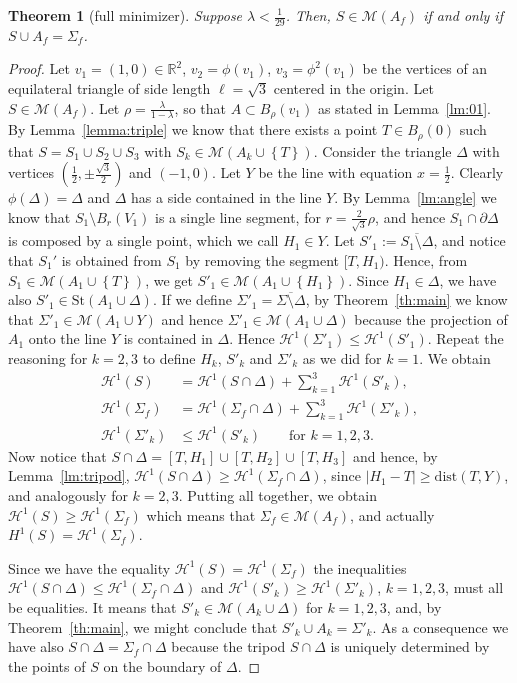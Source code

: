 \documentclass{amsart}
\newcommand{\RR}{\mathbb R}
\renewcommand{\H}{\mathcal H}
\newcommand{\abs}[1]{\left\vert #1 \right\vert}
\newcommand{\enclose}[1]{\left(#1\right)}
\newcommand{\ENCLOSE}[1]{\left\{#1\right\}}
\newcommand{\St}{\mathrm{St}}
\newcommand{\M}{\mathcal{M}}
\renewcommand{\H}{\mathcal{H}}
\newcommand{\dist}{\mathrm{dist}}
\newtheorem{theorem}{Theorem}[section]
\theoremstyle{definition}
\theoremstyle{remark}
\begin{document}
\begin{theorem}[full minimizer]\label{th:full}
  Suppose $\lambda < \frac 1{29}$.
  Then, $S \in \M(A_f)$ if and only if $S\cup A_f = \Sigma_f$.
\end{theorem}
\begin{proof}
  Let $v_1 = (1,0)\in \RR^2$, $v_2=\phi(v_1)$, $v_3=\phi^2(v_1)$ 
  be the vertices of an equilateral 
  triangle of side length $\ell = \sqrt 3$ centered in the origin.
  Let $S\in \M(A_f)$.
  Let $\rho = \frac{\lambda}{1-\lambda}$, so that $A\subset B_\rho(v_1)$ as 
  stated in Lemma~\ref{lm:01}.
  By Lemma~\ref{lemma:triple} we know that there exists a point 
  $T\in B_\rho(0)$ such that $S=S_1\cup S_2\cup S_3$ with $S_k\in \M(A_k\cup \ENCLOSE{T})$.
  Consider the triangle $\Delta$ 
  with vertices $\enclose{\frac 1 2,\pm\frac{\sqrt 3}{2}}$ and $\enclose{-1,0}$.
  Let $Y$ be the line with equation $x=\frac 1 2$.
  Clearly $\phi(\Delta)=\Delta$ and $\Delta$ has a side contained in the line $Y$. 
  By Lemma~\ref{lm:angle} we know that $S_1\setminus B_r(V_1)$ is a single line segment,
  for $r=\frac 2 {\sqrt 3} \rho$,
  and hence $S_1\cap \partial \Delta$ is composed by a single point, 
  which we call $H_1\in Y$. 
  Let $S'_1 := \overline{S_1\setminus \Delta}$, and notice that
  $S_1'$ is obtained from $S_1$ by removing the segment $[T,H_1)$.
  Hence, from $S_1\in \M(A_1\cup \ENCLOSE{T})$, we get $S'_1\in \M(A_1\cup \ENCLOSE{H_1})$. 
  Since $H_1\in \Delta$, we have also $S'_1\in \St(A_1 \cup \Delta)$.
  If we define $\Sigma'_1 = \overline{\Sigma\setminus \Delta}$,
  by Theorem~\ref{th:main} we know that $\Sigma'_1 \in \M(A_1\cup Y)$ 
  and hence $\Sigma'_1 \in \M(A_1\cup \Delta)$ because the projection of $A_1$ onto the line 
  $Y$ is contained in $\Delta$. 
  Hence $\H^1(\Sigma'_1)\le \H^1(S'_1)$.
  Repeat the reasoning for $k=2,3$ to define $H_k$, $S'_k$ and $\Sigma'_k$
  as we did for $k=1$.
  We obtain
  \begin{align*}
    \H^1(S) &= \H^1(S\cap \Delta) + \sum_{k=1}^3 \H^1(S'_k),\\
    \H^1(\Sigma_f) &= \H^1(\Sigma_f\cap \Delta) + \sum_{k=1}^3 \H^1(\Sigma'_k),\\
    \H^1(\Sigma'_k) & \le \H^1(S'_k) \qquad \text{for $k=1,2,3$}.
  \end{align*}
  Now notice that $S\cap \Delta = [T,H_1]\cup [T,H_2]\cup [T,H_3]$
  and hence, by Lemma~\ref{lm:tripod}, $\H^1(S\cap \Delta) \ge \H^1(\Sigma_f\cap \Delta)$,
  since $\abs{H_1 - T}\ge \dist(T,Y)$, and analogously for $k=2,3$.
  Putting all together, we obtain $\H^1(S)\ge \H^1(\Sigma_f)$
  which means that $\Sigma_f\in \M(A_f)$, and actually $H^1(S)=\H^1(\Sigma_f)$.

  Since we have the equality $\H^1(S)=\H^1(\Sigma_f)$ the inequalities 
  $\H^1(S\cap \Delta)\le \H^1(\Sigma_f\cap \Delta)$ and
  $\H^1(S'_k)\ge \H^1(\Sigma'_k)$, $k=1,2,3$, must all be equalities.
  It means that $S'_k\in \M(A_k\cup \Delta)$ for $k=1,2,3$, and,
  by Theorem~\ref{th:main}, we might conclude that $S'_k\cup A_k = \Sigma'_k$.
  As a consequence we have also $S\cap \Delta = \Sigma_f\cap \Delta$ because 
  the tripod $S\cap \Delta$ is uniquely determined by the points of $S$ on 
  the boundary of $\Delta$.
\end{proof}
\end{document}
